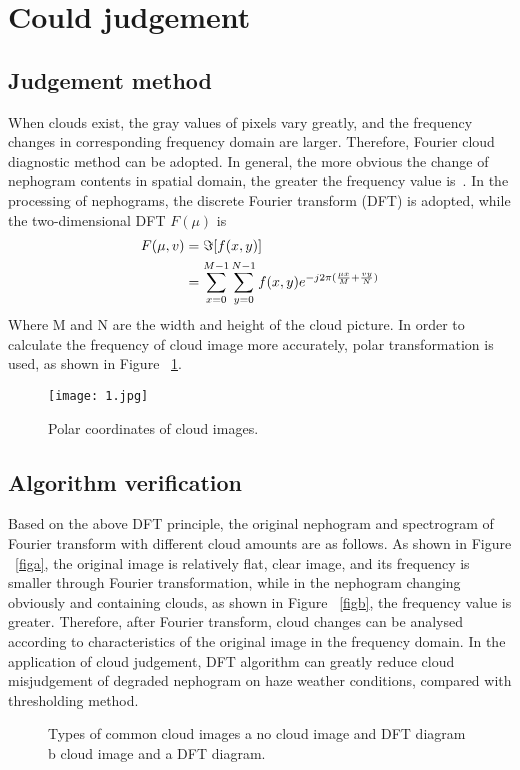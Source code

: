 \documentclass[10pt,twocolumn,letterpaper]{article}
\begin{document}
\section{Could judgement}
\subsection{Judgement method}
When clouds exist, the gray values of pixels vary greatly, and the frequency changes in corresponding frequency domain are larger. Therefore, Fourier cloud diagnostic method can be adopted. In general, the more obvious the change of nephogram contents in spatial domain, the greater the frequency value is~\cite{xiang2017very}.
In the processing of nephograms, the discrete Fourier transform (DFT) is adopted, while the two-dimensional DFT $F(\mu)$ is
\begin{align}
F(\mu,v) &=\Im[f(x,y)]  \notag \\ 
&=\sum_{x=0}^{M-1}\sum_{y=0}^{N-1} f(x,y)e^{-j2\pi(\frac{\mu x}{M}+\frac{vy}{N})}
\end{align}
Where M and N are the width and height of the cloud picture. In order to calculate the frequency of cloud image more accurately, polar transformation is used, as shown in Figure ~\ref{fig:onecol}.

\begin{figure}[!htpb]
\begin{center}
   \texttt{[image: 1.jpg]}
\end{center}
   \caption{Polar coordinates of cloud images.}
\label{fig:onecol}
\end{figure}
\subsection{Algorithm verification}
Based on the above DFT principle, the original nephogram and spectrogram of Fourier transform with different cloud amounts are as follows.
As shown in Figure ~\ref{figa}, the original image is relatively flat, clear image, and its frequency is smaller through Fourier transformation, while in the nephogram changing obviously and containing clouds, as shown in Figure ~\ref{figb}, the frequency value is greater. Therefore, after Fourier transform, cloud changes can be analysed according to characteristics of the original image in the frequency domain. In the application of cloud judgement, DFT algorithm can greatly reduce cloud misjudgement of degraded nephogram on haze weather conditions, compared with thresholding method.
\begin{figure}[!htpb]
\centering
{}
\hspace{1in}
\caption{Types of common cloud images a no cloud image and DFT diagram b cloud image and a DFT diagram.}
\label{fig:twocol} %
\end{figure}

{\small


}
\end{document}

